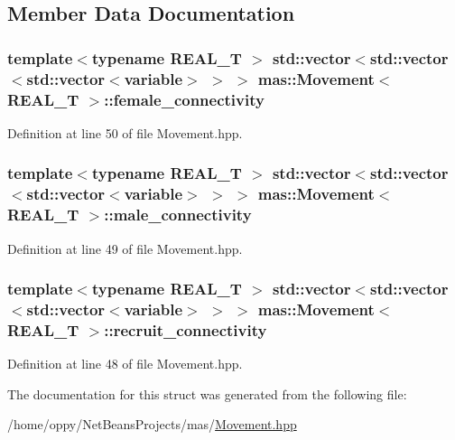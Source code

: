 \subsection{Member Data Documentation}
\hypertarget{structmas_1_1_movement_a5425a809307c33799cd4c0fee06d54f1}{
\subsubsection[{female\-\_\-connectivity}]{\setlength{\rightskip}{0pt plus 5cm}template$<$typename R\-E\-A\-L\-\_\-\-T $>$ std\-::vector$<$std\-::vector$<$std\-::vector$<${\bf variable}$>$ $>$ $>$ {\bf mas\-::\-Movement}$<$ R\-E\-A\-L\-\_\-\-T $>$\-::female\-\_\-connectivity}}\label{structmas_1_1_movement_a5425a809307c33799cd4c0fee06d54f1}


Definition at line 50 of file Movement.\-hpp.

\hypertarget{structmas_1_1_movement_aa48b8bad16dfcbca315467a7a7c6ea95}{
\subsubsection[{male\-\_\-connectivity}]{\setlength{\rightskip}{0pt plus 5cm}template$<$typename R\-E\-A\-L\-\_\-\-T $>$ std\-::vector$<$std\-::vector$<$std\-::vector$<${\bf variable}$>$ $>$ $>$ {\bf mas\-::\-Movement}$<$ R\-E\-A\-L\-\_\-\-T $>$\-::male\-\_\-connectivity}}\label{structmas_1_1_movement_aa48b8bad16dfcbca315467a7a7c6ea95}


Definition at line 49 of file Movement.\-hpp.

\hypertarget{structmas_1_1_movement_a07f5b43bad4f99ee026a0b8d3d354049}{
\subsubsection[{recruit\-\_\-connectivity}]{\setlength{\rightskip}{0pt plus 5cm}template$<$typename R\-E\-A\-L\-\_\-\-T $>$ std\-::vector$<$std\-::vector$<$std\-::vector$<${\bf variable}$>$ $>$ $>$ {\bf mas\-::\-Movement}$<$ R\-E\-A\-L\-\_\-\-T $>$\-::recruit\-\_\-connectivity}}\label{structmas_1_1_movement_a07f5b43bad4f99ee026a0b8d3d354049}


Definition at line 48 of file Movement.\-hpp.



The documentation for this struct was generated from the following file\-:\begin{DoxyCompactItemize}
\item 
/home/oppy/\-Net\-Beans\-Projects/mas/\hyperlink{_movement_8hpp}{Movement.\-hpp}\end{DoxyCompactItemize}
